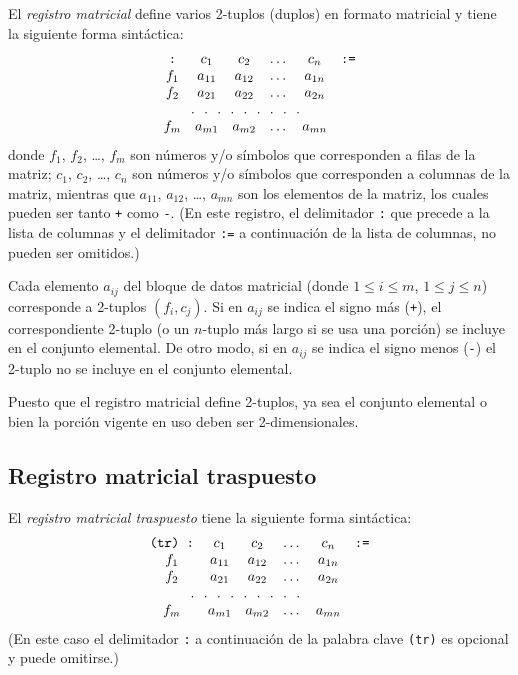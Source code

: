 \documentclass[11pt,spanish]{report}
\begin{document}
El {\it registro matricial} define varios 2-tuplos (duplos) en formato matricial y tiene la siguiente forma sintáctica:
$$\begin{array}{cccccc}
\mbox{{\tt:}}&c_1&c_2&\dots&c_n&\mbox{{\tt:=}}\\
f_1&a_{11}&a_{12}&\dots&a_{1n}&\\
f_2&a_{21}&a_{22}&\dots&a_{2n}&\\
\multicolumn{5}{c}{.\ \ .\ \ .\ \ .\ \ .\ \ .\ \ .\ \ .\ \ .}&\\
f_m&a_{m1}&a_{m2}&\dots&a_{mn}&\\
\end{array}$$
donde $f_1$, $f_2$, \dots, $f_m$ son números y/o símbolos que corresponden a filas de la matriz; $c_1$, $c_2$, \dots, $c_n$ son números y/o símbolos que corresponden a columnas de la matriz, mientras que $a_{11}$, $a_{12}$, \dots, $a_{mn}$ son los elementos de la matriz, los cuales pueden ser tanto {\tt+} como {\tt-}. (En este registro, el delimitador {\tt:} que precede a la lista de columnas y el delimitador {\tt:=} a continuación de la lista de columnas, no pueden ser omitidos.)

Cada elemento $a_{ij}$ del bloque de datos matricial (donde $1\leq i\leq m$,
$1\leq j\leq n$) corresponde a 2-tuplos $(f_i,c_j)$. Si en $a_{ij}$ se indica el signo más ({\tt+}), el correspondiente 2-tuplo (o un $n$-tuplo más largo si se usa una porción) se incluye en el conjunto elemental. De otro modo, si en $a_{ij}$ se indica el signo menos ({\tt-}) el 2-tuplo no se incluye en el conjunto elemental.

Puesto que el registro matricial define 2-tuplos, ya sea el conjunto elemental o bien la porción vigente en uso deben ser 2-dimensionales.

\subsection{Registro matricial traspuesto}

El {\it registro matricial traspuesto} tiene la siguiente forma sintáctica:
$$\begin{array}{cccccc}
\mbox{{\tt(tr) :}}&c_1&c_2&\dots&c_n&\mbox{{\tt:=}}\\
f_1&a_{11}&a_{12}&\dots&a_{1n}&\\
f_2&a_{21}&a_{22}&\dots&a_{2n}&\\
\multicolumn{5}{c}{.\ \ .\ \ .\ \ .\ \ .\ \ .\ \ .\ \ .\ \ .}&\\
f_m&a_{m1}&a_{m2}&\dots&a_{mn}&\\
\end{array}$$
(En este caso el delimitador {\tt:} a continuación de la palabra clave {\tt (tr)} es opcional y puede omitirse.)
\end{document}

